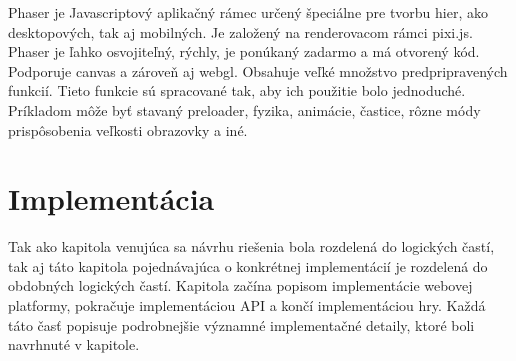 Phaser je Javascriptový aplikačný rámec určený špeciálne pre tvorbu hier, ako desktopových, tak aj mobilných. Je založený na renderovacom rámci pixi.js. Phaser je ľahko osvojiteľný, rýchly, je ponúkaný zadarmo a má otvorený kód. Podporuje canvas a zároveň aj webgl. Obsahuje veľké množstvo predpripravených funkcií. Tieto funkcie sú spracované tak, aby ich použitie bolo jednoduché. Príkladom môže byť stavaný preloader, fyzika, animácie, častice, rôzne módy prispôsobenia veľkosti obrazovky a iné. \cite{phaser}


\chapter{Implementácia}
\label{chap:implementacia}
Tak ako kapitola venujúca sa návrhu riešenia bola rozdelená do logických častí, tak aj táto kapitola pojednávajúca o konkrétnej implementácií je rozdelená do obdobných logických častí. Kapitola začína popisom implementácie webovej platformy, pokračuje implementáciou API a končí implementáciou hry.  Každá táto časť popisuje podrobnejšie významné implementačné detaily, ktoré boli navrhnuté v kapitole. 

